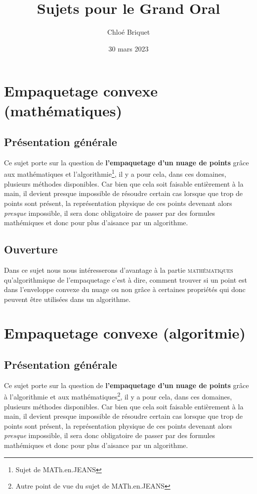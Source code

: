 \documentclass[a4paper, 12pt]{article}
\date{30 mars 2023}
\title{Sujets pour le Grand Oral}
\author{Chloé Briquet}
\begin{document}
    \maketitle
    \renewcommand{\contentsname}{Sommaire}
    \tableofcontents{}

    \section{Empaquetage convexe (mathématiques)}
        \subsection{Présentation générale}
            \indent{    }Ce sujet porte sur la question de \textbf{l'empaquetage d'un nuage de points} grâce aux mathématiques et
            l'algorithmie\footnote[1]{Sujet de MATh.en.JEANS}, il y a pour cela, dans ces domaines, plusieurs méthodes disponibles. Car bien que cela soit faisable entièrement
            à la main, il devient presque impossible de résoudre certain cas lorsque que trop de points sont présent, la représentation physique de ces points devenant alors
            \textit{presque} impossible, il sera donc obligatoire de passer par des formules mathémiques et donc pour plus d'aisance par un algorithme.

            \vspace{1cm}
        \subsection{Ouverture}
            \indent{    } Dans ce sujet nous nous intéresserons d'avantage à la partie \textsc{mathématiques} qu'algorithmique de l'empaquetage c'est à dire, comment trouver
            si un point est dans l'enveloppe convexe du nuage ou non grâce à certaines propriétés qui donc peuvent être utilisées dans un algorithme.


    \newpage


    \section{Empaquetage convexe (algoritmie)}
        \subsection{Présentation générale}
            \indent{    }Ce sujet porte sur la question de \textbf{l'empaquetage d'un nuage de points} grâce à l'algorithmie et aux mathématiques\footnote[2]{Autre point de vue du
            sujet de MATh.en.JEANS}, il y a pour cela, dans ces domaines, plusieurs méthodes disponibles. Car bien que cela soit faisable entièrement
            à la main, il devient presque impossible de résoudre certain cas lorsque que trop de points sont présent, la représentation physique de ces points devenant alors
            \textit{presque} impossible, il sera donc obligatoire de passer par des formules mathémiques et donc pour plus d'aisance par un algorithme.
\end{document}
